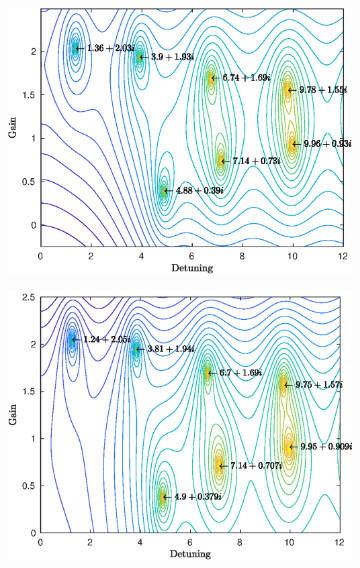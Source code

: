 \begin{figure}
\begin{subfigure}{0.32\textwidth}
		\caption{}
		\label{fig:simple_cavity:oseen_surf}
	\end{subfigure}

	\begin{subfigure}{0.32\textwidth}
		\includegraphics[width=\textwidth]{plots/simple/contour}
		\caption{}
		\label{fig:simple_cavity:mycwt_contour}
	\end{subfigure}
	\begin{subfigure}{0.32\textwidth}
		\includegraphics[width=\textwidth]{plots/simple/contour_topf}
		\caption{}
		\label{fig:simple_cavity:topf_contour}
	\end{subfigure}
	\begin{subfigure}{0.32\textwidth}

\end{subfigure}
\end{figure}
